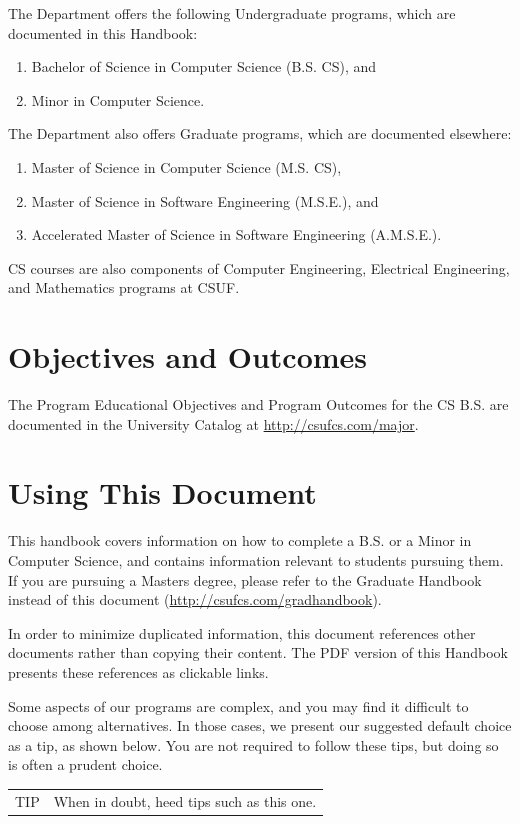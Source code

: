 \documentclass{book}
\newenvironment{tip}{
  \tcolorbox \begin{tabular}{m{.5in} m{5.25in}}
    \Large{TIP} &
}{
  \end{tabular} \endtcolorbox
}
\newcommand{\CampusName}{CSUF}
\newcommand{\shrunkurl}[1]{\url{http://csufcs.com/#1}}
\begin{document}
The Department offers the following Undergraduate programs, which are
documented in this Handbook:
\begin{enumerate}
\item Bachelor of Science in Computer Science (B.S. CS), and
\item Minor in Computer Science.
\end{enumerate}

The Department also offers Graduate programs, which are documented elsewhere:
\begin{enumerate}
\item Master of Science in Computer Science (M.S. CS),
\item Master of Science in Software Engineering (M.S.E.), and
\item Accelerated Master of Science in Software Engineering (A.M.S.E.).
\end{enumerate}

CS courses are also components of Computer Engineering, Electrical
Engineering, and Mathematics programs at \CampusName.

\section{Objectives and Outcomes}
 
The Program Educational Objectives and Program Outcomes for the CS
B.S. are documented in the University Catalog at \shrunkurl{major}.

\section{Using This Document}

This handbook covers information on how to complete a B.S. or a Minor
in Computer Science, and contains information relevant to students
pursuing them. If you are pursuing a Masters degree, please refer to
the Graduate Handbook instead of this document
(\shrunkurl{gradhandbook}).

In order to minimize duplicated information, this document references
other documents rather than copying their content. The PDF version of
this Handbook presents these references as clickable links.

Some aspects of our programs are complex, and you may find it
difficult to choose among alternatives. In those cases, we present our
suggested default choice as a tip, as shown below. You are not
required to follow these tips, but doing so is often a prudent choice.
\begin{tip}
When in doubt, heed tips such as this one.
\end{tip}
\end{document}
